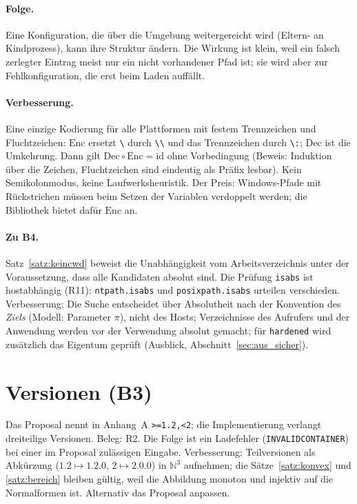 \documentclass[a4paper,12pt,twoside]{report}
\DeclareRobustCommand{\_}{\ifmmode\mbox{\textunderscore}\else\textunderscore\allowbreak{}\fi}
\theoremstyle{definition}
\newcommand{\Bf}[1]{\textbf{B#1}}
\begin{document}
\paragraph{Folge.} Eine Konfiguration, die über die Umgebung weitergereicht wird (Eltern- an Kindprozess), kann ihre Struktur ändern. Die Wirkung ist klein, weil ein falsch zerlegter Eintrag meist nur ein nicht vorhandener Pfad ist; sie wird aber zur Fehlkonfiguration, die erst beim Laden auffällt.

\paragraph{Verbesserung.} Eine einzige Kodierung für alle Plattformen mit festem Trennzeichen und Fluchtzeichen: $\mathrm{Enc}$ ersetzt \texttt{\textbackslash} durch \texttt{\textbackslash\textbackslash} und das Trennzeichen durch \texttt{\textbackslash:}; $\mathrm{Dec}$ ist die Umkehrung. Dann gilt $\mathrm{Dec}\circ\mathrm{Enc}=\mathrm{id}$ ohne Vorbedingung (Beweis: Induktion über die Zeichen, Fluchtzeichen sind eindeutig als Präfix lesbar). Kein Semikolonmodus, keine Laufwerksheuristik. Der Preis: Windows-Pfade mit Rückstrichen müssen beim Setzen der Variablen verdoppelt werden; die Bibliothek bietet dafür $\mathrm{Enc}$ an.

\paragraph{Zu \Bf{4}.}
\label{sec:b4}
Satz~\ref{satz:keincwd} beweist die Unabhängigkeit vom Arbeitsverzeichnis unter der Voraussetzung, dass alle Kandidaten absolut sind. Die Prüfung \texttt{isabs} ist hostabhängig (R11): \texttt{ntpath.isabs} und \texttt{posixpath.isabs} urteilen verschieden. Verbesserung: Die Suche entscheidet über Absolutheit nach der Konvention des \emph{Ziels} (Modell: Parameter $\pi$), nicht des Hosts; Verzeichnisse des Aufrufers und der Anwendung werden vor der Verwendung absolut gemacht; für \texttt{hardened} wird zusätzlich das Eigentum geprüft (Ausblick, Abschnitt~\ref{sec:aus_sicher}).

\section{Versionen (\Bf{3})}
Das Proposal nennt in Anhang~A \texttt{>=1.2,<2}; die Implementierung verlangt dreiteilige Versionen. Beleg: R2. Die Folge ist ein Ladefehler (\texttt{INVALID\_CONTAINER}) bei einer im Proposal zulässigen Eingabe. Verbesserung: Teilversionen als Abkürzung ($1.2\mapsto1.2.0$, $2\mapsto2.0.0$) in $\mathbb N^3$ aufnehmen; die Sätze~\ref{satz:konvex} und \ref{satz:bereich} bleiben gültig, weil die Abbildung monoton und injektiv auf die Normalformen ist. Alternativ das Proposal anpassen.
\end{document}
